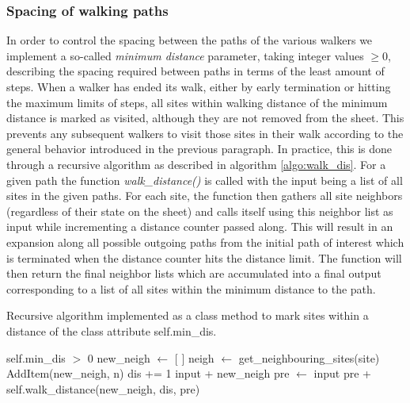 \subsubsection{Spacing of walking paths} %
In order to control the spacing between the paths of the various walkers we
implement a so-called \textit{minimum distance} parameter, taking integer values $\ge 0$, describing the spacing required between paths in terms of the least amount of
steps. When a walker has ended its walk, either by early termination or hitting
the maximum limits of steps, all sites within walking distance of the minimum
distance is marked as visited, although they are not removed from the sheet.
This prevents any subsequent walkers to visit those sites in their walk
according to the general behavior introduced in the previous paragraph. In
practice, this is done through a recursive algorithm as described in algorithm
\cref{algo:walk_dis}. For a given path the function \textit{walk\_distance()} is called with the input being a list of all sites in the given paths. For each site, the function then gathers all site neighbors (regardless of their state on the sheet) and calls itself using this neighbor list as input while incrementing a
distance counter passed along. This will result in an expansion along all
possible outgoing paths from the initial path of interest which is terminated
when the distance counter hits the distance limit. The function will
then return the final neighbor lists which are accumulated into a final output
corresponding to a list of all sites within the minimum distance to the path.

\begin{algorithm}[H]
  \caption{Recursive algorithm implemented as a class method to mark sites within a distance of the class attribute self.min\_dis.}
  \label{algo:walk_dis}
  \begin{algorithmic}[1]
    \Require self.min\_dis $>$ 0 
      \State new\_neigh $\gets$ [ ] 
        \State neigh $\gets$ get\_neighbouring\_sites(site) 
           
            \State AddItem(new\_neigh, n)
          \EndIf
        \EndFor
      \EndFor
      \State dis += 1 
       
        \State \Return input + new\_neigh 
      \Else {}
        \State pre $\gets$ input
        \State \Return pre +  self.walk\_distance(new\_neigh, dis, pre)
      \EndIf
    \EndFunction
  \end{algorithmic}
\end{algorithm}

